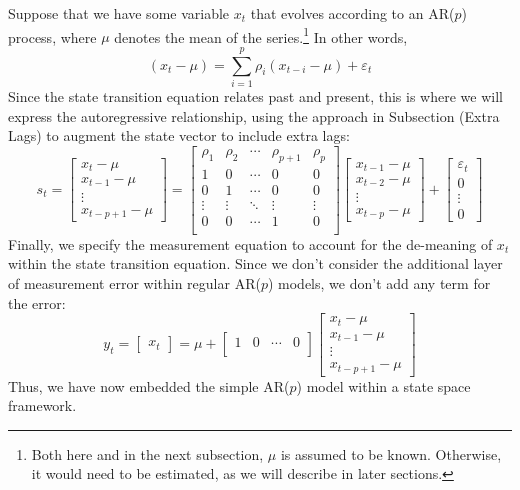 \documentclass[a4paper,12pt]{article}
\begin{document}
Suppose that we have some variable $x_t$ that evolves according to an AR($p$) process, where $\mu$ denotes the mean of the series.\footnote{Both here and in the next subsection, $\mu$ is assumed to be known. Otherwise, it would need to be estimated, as we will describe in later sections.} In other words,
\[
  (x_t - \mu) = \sum^p_{i=1} \rho_i (x_{t-i} - \mu)
  + \varepsilon_t
\]
Since the state transition equation relates past and present, this is where we will express the autoregressive relationship, using the approach in Subsection (Extra Lags) to augment the state vector to include extra lags:
\[
  s_t =
  \begin{bmatrix} x_t - \mu \\ x_{t-1} - \mu \\ \vdots \\
    x_{t-p+1} - \mu \end{bmatrix}
  =
  \begin{bmatrix}
    \rho_1 & \rho_2 & \cdots & \rho_{p+1} & \rho_p \\
    1 & 0 & \cdots & 0 & 0 \\
    0 & 1 & \cdots & 0 & 0 \\
    \vdots & \vdots & \ddots & \vdots & \vdots \\
    0 & 0 & \cdots & 1 & 0 \\
  \end{bmatrix}
  \begin{bmatrix} x_{t-1} - \mu \\ x_{t-2} - \mu \\ \vdots \\
    x_{t-p}- \mu \end{bmatrix}
  + \begin{bmatrix} \varepsilon_t \\ 0 \\ \vdots \\ 0
  \end{bmatrix}
\]
Finally, we specify the measurement equation to account for the de-meaning of $x_t$ within the state transition equation. Since we don't consider the additional layer of measurement error within regular AR($p$) models, we don't add any term for the error:
\[
  y_t = \begin{bmatrix} x_t \end{bmatrix}
  = \mu +
  \begin{bmatrix}
  1 & 0 & \cdots & 0 \\
  \end{bmatrix}
  \begin{bmatrix} x_t - \mu \\ x_{t-1} - \mu \\ \vdots \\
    x_{t-p+1} - \mu \end{bmatrix}
\]
Thus, we have now embedded the simple AR($p$) model within a state space framework.
\end{document}
